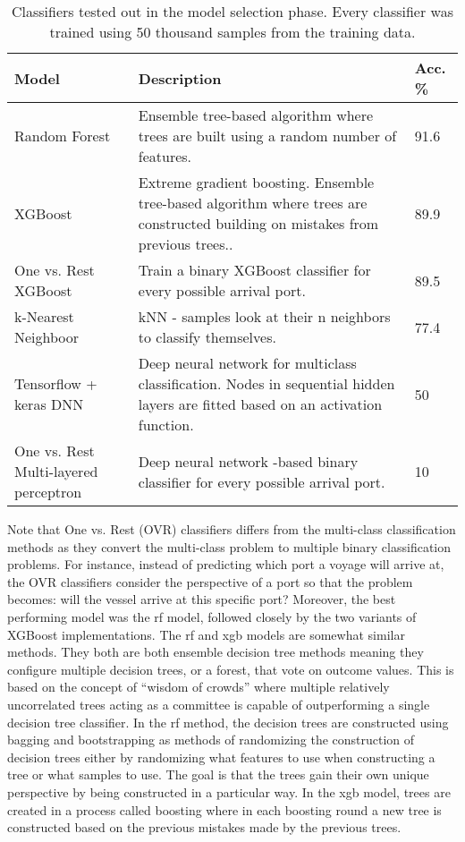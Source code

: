 \begin{table}[htbp]
    \centering
    \small{\begin{tabularx}{1.0\textwidth}{p{1.0in} X p{0.7in}}
            \bfseries{Model} & \bfseries{Description} & \bfseries{Acc. \%} \\ \toprule
            Random Forest & Ensemble tree-based algorithm where trees are built using a random number of features. & 91.6 \\ \midrule
            XGBoost & Extreme gradient boosting. Ensemble tree-based algorithm where trees are constructed building on mistakes from previous trees.. & 89.9 \\ \midrule
            One vs. Rest XGBoost & Train a binary XGBoost classifier for every possible arrival port.  & 89.5 \\ \midrule
            k-Nearest Neighboor & kNN - samples look at their n neighbors to classify themselves. & 77.4 \\ \midrule
            Tensorflow + keras DNN & Deep neural network for multiclass classification. Nodes in sequential hidden layers are fitted based on an activation function. & 50 \\ \midrule
            One vs. Rest Multi-layered perceptron & Deep neural network -based binary classifier for every possible arrival port. & 10 \\ \bottomrule
    \end{tabularx}}
\caption{Classifiers tested out in the model selection phase. Every classifier was trained using 50 thousand samples from the training data.}\label{tab:model_selection}
\end{table}

Note that One vs. Rest (OVR) classifiers differs from the multi-class classification methods as they convert the multi-class problem to multiple binary classification problems. For instance, instead of predicting which port a voyage will arrive at, the OVR classifiers consider the perspective of a port so that the problem becomes: will the vessel arrive at this specific port? Moreover, the best performing model was the \acrfull{rf} model, followed closely by the two variants of XGBoost implementations. The \acrshort{rf} and \acrshort{xgb} models are somewhat similar methods. They both are both ensemble decision tree methods meaning they configure multiple decision trees, or a forest, that vote on outcome values. This is based on the concept of ``wisdom of crowds'' where multiple relatively uncorrelated trees acting as a committee is capable of outperforming a single decision tree classifier. In the \acrshort{rf} method, the decision trees are constructed using bagging and bootstrapping as methods of randomizing the construction of decision trees either by randomizing what features to use when constructing a tree or what samples to use. The goal is that the trees gain their own unique perspective by being constructed in a particular way. In the \acrshort{xgb} model, trees are created in a process called boosting where in each boosting round a new tree is constructed based on the previous mistakes made by the previous trees.

